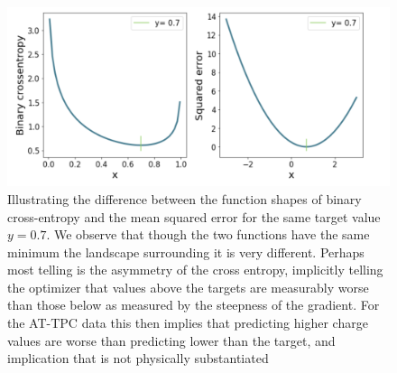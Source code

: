 \begin{figure}
\centering
\includegraphics[width=\textwidth]{plots/loss_func_shape.png}
\caption[Illustrating differences in the shapes of the MSE and BCE-loss]{Illustrating the difference between the function shapes of binary cross-entropy and the mean squared error for the same target value $y=0.7$. We observe that though the two functions have the same minimum the landscape surrounding it is very different. Perhaps most telling is the asymmetry of the cross entropy, implicitly telling the optimizer that values above the targets are measurably worse than those below as measured by the steepness of the gradient. For the AT-TPC data this then implies that predicting higher charge values are worse than predicting lower than the target, and implication that is not physically substantiated}\label{fig:loss_func_shape}
\end{figure}